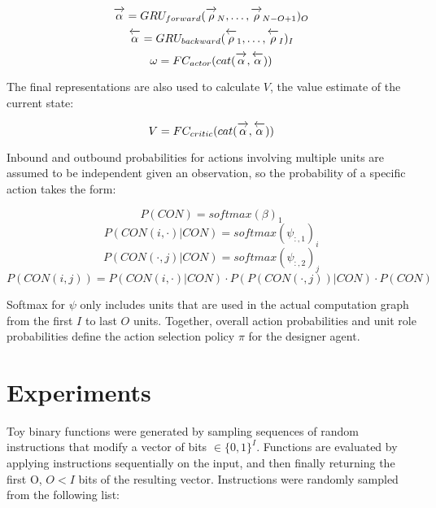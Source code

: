 \documentclass{article}[12px]
\newcommand{\ora}[1]{\overrightarrow{#1\vphantom{j}}}
\newcommand{\ola}[1]{\overleftarrow{#1\vphantom{j}}}
\begin{document}
\begin{equation}
  \ora{\alpha} = GRU_{forward}(\ora{\rho}_{N}, \ldots, \ora{\rho}_{N-O+1})_O
\end{equation}
\begin{equation}
  \ola{\alpha} = GRU_{backward}(\ola{\rho}_1, \ldots, \ola{\rho}_I)_I
\end{equation}
\begin{equation}
  \omega = FC_{actor}(cat(\ora{\alpha}, \ola{\alpha}))
\end{equation}

The final representations are also used to calculate \(V\), the value estimate of the current state:

\begin{equation}
  V = FC_{critic}(cat(\ora{\alpha}, \ola{\alpha}))
\end{equation}

Inbound and outbound probabilities for actions involving multiple units are assumed to be independent given an observation, so the probability of a specific action takes the form:

\begin{equation}
  P(CON) = softmax(\beta)_1
\end{equation}
\begin{equation}
  P(CON(i, \cdot) | CON) = softmax(\psi_{:, 1})_i
\end{equation}
\begin{equation}
  P(CON(\cdot, j) | CON) = softmax(\psi_{:, 2})_j
\end{equation}
\begin{equation}
  P(CON(i, j)) = P(CON(i, \cdot) | CON) \cdot P(P(CON(\cdot, j)) | CON) \cdot P(CON)
\end{equation}

Softmax for \(\psi\) only includes units that are used in the actual computation graph from the first \(I\) to last \(O\) units. Together, overall action probabilities and unit role probabilities define the action selection policy \(\pi\) for the designer agent.

\section{Experiments} \label{experiments}

Toy binary functions were generated by sampling sequences of random instructions that modify a vector of bits \(\in\{0, 1\}^I\). Functions are evaluated by applying instructions sequentially on the input, and then finally returning the first O, \(O < I\) bits of the resulting vector. Instructions were randomly sampled from the following list:
\end{document}
